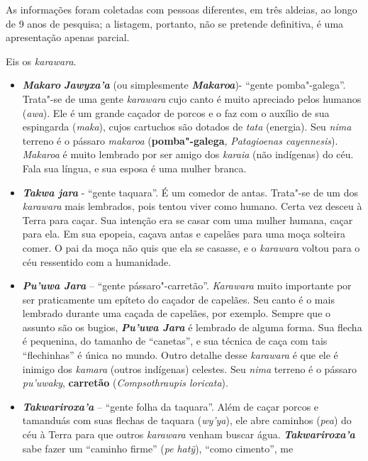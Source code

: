 As informações foram coletadas com pessoas diferentes, em três aldeias,
ao longo de 9 anos de pesquisa; a listagem, portanto, não se pretende
definitiva, é uma apresentação apenas parcial.

Eis os \emph{karawara}.

\begin{itemize}
\item
  \emph{\textbf{Makaro}} \emph{\textbf{Jawyxa'a}} (ou simplesmente
  \emph{\textbf{Makaroa}})- ``gente pomba"-galega''. Trata"-se de uma
  gente \emph{karawara} cujo canto é muito apreciado pelos humanos
  (\emph{awa}). Ele é um grande caçador de porcos e o faz com o auxílio
  de sua espingarda (\emph{maka}), cujos cartuchos são dotados de
  \emph{tata} (energia). Seu \emph{nima} terreno é o pássaro
  \emph{makaroa} (\textbf{pomba"-galega}, \emph{Patagioenas cayennesis}).
  \emph{Makaroa} é muito lembrado por ser amigo dos \emph{karaia} (não
  indígenas) do céu. Fala sua língua, e sua esposa é uma mulher branca.
\item
  \emph{\textbf{Takwa jara}} - ``gente taquara''. É um comedor de antas.
  Trata"-se de um dos \emph{karawara} mais lembrados, pois tentou viver
  como humano. Certa vez desceu à Terra para caçar. Sua intenção era se
  casar com uma mulher humana, caçar para ela. Em sua epopeia, caçava
  antas e capelães para uma moça solteira comer. O pai da moça não quis
  que ela se casasse, e o \emph{karawara} voltou para o céu ressentido
  com a humanidade.
\item
  \emph{\textbf{Pu'uwa Jara}} -- ``gente pássaro"-carretão''.
  \emph{Karawara} muito importante por ser praticamente um epíteto do
  caçador de capelães. Seu canto é o mais lembrado durante uma caçada de
  capelães, por exemplo. Sempre que o assunto são os bugios,
  \textbf{\emph{Pu'uwa Jara}} é lembrado de alguma forma. Sua flecha é
  pequenina, do tamanho de ``canetas'', e sua técnica de caça com tais
  ``flechinhas'' é única no mundo. Outro detalhe desse \emph{karawara} é
  que ele é inimigo dos \emph{kamara} (outros indígenas) celestes. Seu
  \emph{nima} terreno é o pássaro \emph{pu'uwaky}, \textbf{carretão}
  (\emph{Compsothraupis loricata}).
\item
  \emph{\textbf{Takwariroxa'a}} -- ``gente folha da taquara''. Além de
  caçar porcos e tamanduás com suas flechas de taquara (\emph{wy'ya}),
  ele abre caminhos (\emph{pea}) do céu à Terra para que outros
  \emph{karawara} venham buscar água. \emph{\textbf{Takwariroxa'a}} sabe
  fazer um ``caminho firme'' (\emph{pe} \emph{hatỹ}), ``como cimento'', me

\end{itemize}
